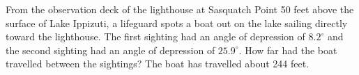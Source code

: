 {From the observation deck of the lighthouse at Sasquatch Point 50 feet above the surface of Lake Ippizuti, a lifeguard spots a boat out on the lake sailing directly toward the lighthouse.  The first sighting had an angle of depression of $8.2^{\circ}$ and the second sighting had an angle of depression of $25.9^{\circ}$.  How far had the boat travelled between the sightings?}
{The boat has travelled about 244 feet.}